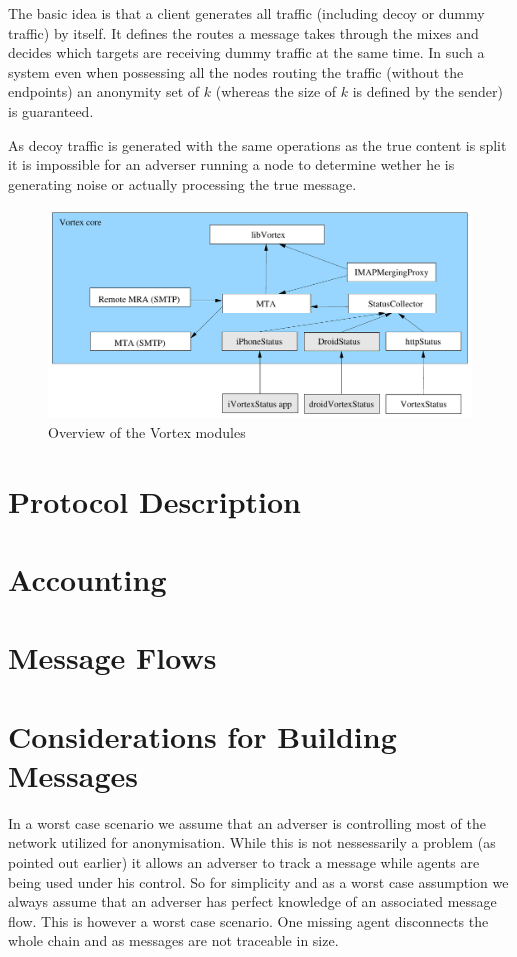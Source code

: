 The basic idea is that a client generates all traffic (including decoy or dummy traffic) by itself. It defines the routes a message takes through the mixes and decides which targets are receiving dummy traffic at the same time. In such a system even when possessing all the nodes routing the traffic (without the endpoints) an anonymity set of $k$ (whereas the size of $k$ is defined by the sender) is guaranteed.

As decoy traffic is generated with the same operations as the true content is split it is impossible for an adverser running a node to determine wether he is generating noise or actually processing the true message.

\begin{figure}[h]
	\includegraphics[width=\columnwidth]{inc/VortexModules}
	\caption{Overview of the Vortex modules}
	\label{fig:vortexModules}
\end{figure}

\section{Protocol Description}
\section{Accounting}
\section{Message Flows}

\section{Considerations for Building Messages}
In a worst case scenario we assume that an adverser is controlling most of the network utilized for anonymisation. While this is not nessessarily a problem (as pointed out earlier) it allows an adverser to track a message while agents are being used under his control. So for simplicity and as a worst case assumption we always assume that an adverser has perfect knowledge of an associated message flow. This is however a worst case scenario. One missing agent disconnects the whole chain and as messages are not traceable in size.

